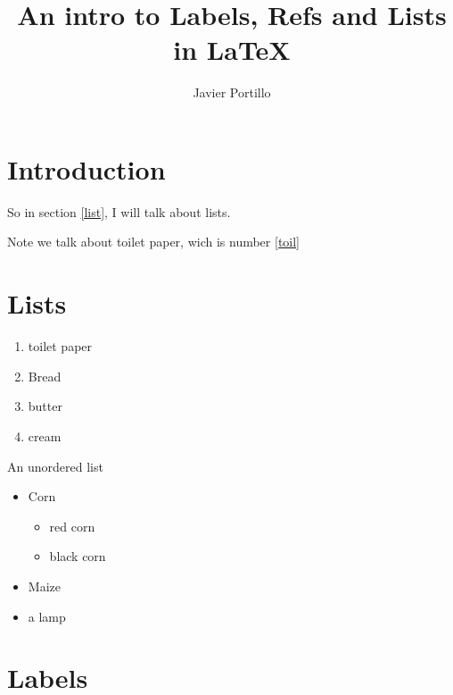 \documentclass{article}
\author{Javier Portillo}
\title{An intro to Labels, Refs and Lists in {\LaTeX}}
\begin{document}
\maketitle

\section{Introduction}

So in section \ref{list}, I will talk about lists.

Note we talk about toilet paper, wich is number \ref{toil}

\section{Lists\label{list}}

\begin{enumerate}
	\item toilet paper\label{toil}
	\item Bread
	\item butter
	\item cream
\end{enumerate}

An unordered list

\begin{itemize}
	\item Corn
	      \begin{itemize}
		      \item red corn
		      \item black corn
	      \end{itemize}
	\item Maize
	\item a lamp
\end{itemize}

\section{Labels}
\end{document}
